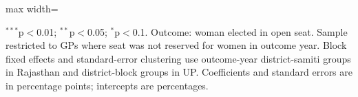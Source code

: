 \begin{adjustbox}{max width=\linewidth}
\begin{threeparttable}[b]
      \begin{tablenotes}
         \item $^{***}$p$<$0.01; $^{**}$p$<$0.05; $^{*}$p$<$0.1. Outcome: woman elected in open seat. Sample restricted to GPs where seat was not reserved for women in outcome year. Block fixed effects and standard-error clustering use outcome-year district-samiti groups in Rajasthan and district-block groups in UP. Coefficients and standard errors are in percentage points; intercepts are percentages.
      \end{tablenotes}
   \end{threeparttable}
\end{adjustbox}
\par\endgroup


